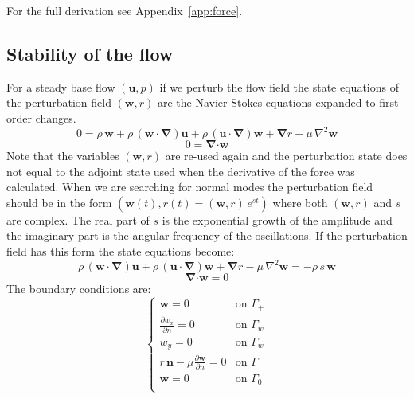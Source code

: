 \documentclass[12pt, a4paper]{article}
\begin{document}
        For the full derivation see Appendix~\ref{app:force}.
        
    \subsection{Stability of the flow}
        For a steady base flow $(\mathbf{u},p)$ if we perturb the flow field the state equations of the perturbation field $(\mathbf{w},r)$ are the Navier-Stokes equations expanded to first order changes.
        \begin{equation}
        0 = \rho \, \mathbf{\dot{w}} + 
        \rho \, (\mathbf{w \cdot} \boldsymbol{\nabla}) \mathbf{u} + 
        \rho \, (\mathbf{u \cdot} \boldsymbol{\nabla}) \mathbf{w} + 
        \boldsymbol{\nabla} r - 
        \mu \, \nabla^2 \mathbf{w}
        \end{equation}
        \begin{equation}
        0 = \boldsymbol{\nabla} \mathbf{\cdot w}
        \end{equation}
        Note that the variables $(\mathbf{w}, r)$ are re-used again and the perturbation state does not equal to the adjoint state used when the derivative of the force was calculated. When we are searching for normal modes the perturbation field should be in the form $(\mathbf{w}(t),r(t) = (\mathbf{w},r) \, e^{st})$ where both $(\mathbf{w},r)$ and $s$ are complex. The real part of $s$ is the exponential growth of the amplitude and the imaginary part is the angular frequency of the oscillations. If the perturbation field has this form the state equations become:
        \begin{equation} \label{perturbation_1}
        \rho \, (\mathbf{w \cdot} \boldsymbol{\nabla}) \mathbf{u} + 
        \rho \, (\mathbf{u \cdot} \boldsymbol{\nabla}) \mathbf{w} + 
        \boldsymbol{\nabla} r - 
        \mu \, \nabla^2 \mathbf{w} = 
        - \rho \, s \, \mathbf{w} 
        \end{equation}
        \begin{equation} \label{perturbation_2}
        \boldsymbol{\nabla} \mathbf{\cdot w} = 0
        \end{equation}
        The boundary conditions are:
        \begin{equation} \label{perturbation_bcs}
        \begin{cases}
        \mathbf{w} = 0 & \text{on } \Gamma_+ \\
        \frac{\partial w_x}{\partial n} = 0 & \text{on } \Gamma_w \\
        w_y = 0 & \text{on } \Gamma_w \\
        r \, \mathbf{n} - \mu \frac{\partial \mathbf{w}}{\partial n} = 0 & \text{on } \Gamma_- \\
        \mathbf{w} = 0 & \text{on } \Gamma_0 \\
        \end{cases}
        \end{equation}
\end{document}
